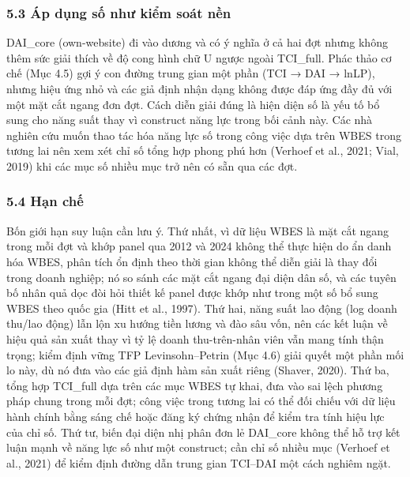 \documentclass[12pt,a4paper]{article}
\begin{document}
\hypertarget{53-uxe1p-dux1ee5ng-sux1ed1-nhux1b0-kiux1ec3m-souxe1t-nux1ec1n}{%
\subsubsection{5.3 Áp dụng số như kiểm soát
nền}\label{53-uxe1p-dux1ee5ng-sux1ed1-nhux1b0-kiux1ec3m-souxe1t-nux1ec1n}}

DAI\_core (own-website) đi vào dương và có ý nghĩa ở cả hai đợt nhưng
không thêm sức giải thích về độ cong hình chữ U ngược ngoài TCI\_full.
Phác thảo cơ chế (Mục 4.5) gợi ý con đường trung gian một phần (TCI →
DAI → lnLP), nhưng hiệu ứng nhỏ và các giả định nhận dạng không được đáp
ứng đầy đủ với một mặt cắt ngang đơn đợt. Cách diễn giải đúng là hiện
diện số là yếu tố bổ sung cho năng suất thay vì construct năng lực trong
bối cảnh này. Các nhà nghiên cứu muốn thao tác hóa năng lực số trong
công việc dựa trên WBES trong tương lai nên xem xét chỉ số tổng hợp
phong phú hơn (Verhoef et al., 2021; Vial, 2019) khi các mục số nhiều
mục trở nên có sẵn qua các đợt.

\hypertarget{54-hux1ea1n-chux1ebf}{%
\subsubsection{5.4 Hạn chế}\label{54-hux1ea1n-chux1ebf}}

Bốn giới hạn suy luận cần lưu ý. Thứ nhất, vì dữ liệu WBES là mặt cắt
ngang trong mỗi đợt và khớp panel qua 2012 và 2024 không thể thực hiện
do ẩn danh hóa WBES, phân tích ổn định theo thời gian không thể diễn
giải là thay đổi trong doanh nghiệp; nó so sánh các mặt cắt ngang đại
diện dân số, và các tuyên bố nhân quả dọc đòi hỏi thiết kế panel được
khớp như trong một số bổ sung WBES theo quốc gia (Hitt et al., 1997).
Thứ hai, năng suất lao động (log doanh thu/lao động) lẫn lộn xu hướng
tiền lương và đào sâu vốn, nên các kết luận về hiệu quả sản xuất thay vì
tỷ lệ doanh thu-trên-nhân viên vẫn mang tính thận trọng; kiểm định vững
TFP Levinsohn--Petrin (Mục 4.6) giải quyết một phần mối lo này, dù nó
đưa vào các giả định hàm sản xuất riêng (Shaver, 2020). Thứ ba, tổng hợp
TCI\_full dựa trên các mục WBES tự khai, đưa vào sai lệch phương pháp
chung trong mỗi đợt; công việc trong tương lai có thể đối chiếu với dữ
liệu hành chính bằng sáng chế hoặc đăng ký chứng nhận để kiểm tra tính
hiệu lực của chỉ số. Thứ tư, biến đại diện nhị phân đơn lẻ DAI\_core
không thể hỗ trợ kết luận mạnh về năng lực số như một construct; cần chỉ
số nhiều mục (Verhoef et al., 2021) để kiểm định đường dẫn trung gian
TCI--DAI một cách nghiêm ngặt.
\end{document}
